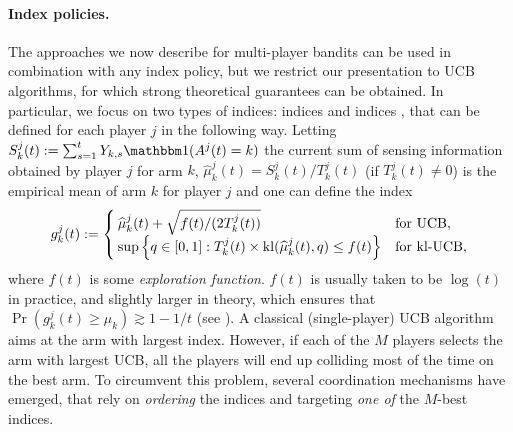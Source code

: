 \paragraph{Index policies.}
%
The approaches we now describe for multi-player bandits can be used in combination with any index policy, but we restrict our presentation to UCB algorithms, for which strong theoretical guarantees can be obtained. In particular, we focus on two types of indices:
\UCB{} indices \citep{Auer02}
and \klUCB{} indices \citep{KLUCBJournal}, that can be defined for each player $j$ in the following way.
%
Letting $S_k^j(t) := \sum_{s=1}^t Y_{k,s} \indic(A^j(t) = k)$ the current sum of sensing information obtained by player $j$ for arm $k$, $\widehat{\mu}_k^j(t) = S_k^j(t)/T_k^j(t)$ (if $T_k^j(t)\neq 0$) is the empirical mean of arm $k$ for player $j$ and one can define the index
\begin{equation}\label{eq:5:indexFor_UCB_klUCB}
  g_k^j(t) := \begin{cases}
      \widehat{\mu}_k^j(t)  + \sqrt{  f(t) / (2T_k^j(t))}
      &\text{for } \mathrm{UCB}, \\
      \sup\left\{ q \in [0, 1]: T_k^j(t)\times \mathrm{kl}(\widehat{\mu}_k^j(t), q) \leq f(t) \right\}
      &\text{for } \mathrm{kl}\text{-}\mathrm{UCB},
  \end{cases}
\end{equation}
where $f(t)$ is some \emph{exploration function}. $f(t)$ is usually taken to be $\log(t)$ in practice, and slightly larger in theory, which ensures that  $\Pr(g_k^j(t) \geq \mu_k) \gtrsim 1 - 1/t$ (see \cite{KLUCBJournal}).
A classical (single-player) UCB algorithm aims at the arm with largest index. However, if each of the $M$ players selects the arm with largest UCB, all the players will end up colliding most of the time on the best arm.
To circumvent this problem, several coordination mechanisms have emerged, that rely on \emph{ordering} the indices and targeting \emph{one of} the $M$-best indices.



